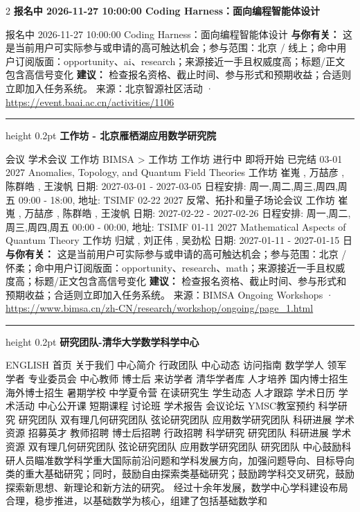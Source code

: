 \documentclass[10.5pt]{ctexart}
\begin{document}
\begin{multicols}{2}
{\large\bfseries 报名中 2026-11-27 10:00:00 Coding Harness：面向编程智能体设计}\par
报名中 2026-11-27 10:00:00 Coding Harness：面向编程智能体设计
\textbf{与你有关：} 这是当前用户可实际参与或申请的高可触达机会；参与范围：北京 / 线上；命中用户订阅版面：opportunity、ai、research；来源接近一手且权威度高；标题/正文包含高信号变化
\textbf{建议：} 检查报名资格、截止时间、参与形式和预期收益；合适则立即加入任务系统。
{\footnotesize\color{ormuted} 来源：北京智源社区活动 · \url{https://event.baai.ac.cn/activities/1106}}
\vspace{2mm}
\hrule height 0.2pt
\vspace{2mm}
{\large\bfseries 工作坊 - 北京雁栖湖应用数学研究院}\par
会议 学术会议 工作坊 BIMSA > 工作坊 工作坊 进行中 即将开始 已完结 03-01 2027 Anomalies, Topology, and Quantum Field Theories 工作坊 崔嵬 , 万喆彦 , 陈群皓 , 王浚帆 日期: 2027-03-01 - 2027-03-05 日程安排: 周一,周二,周三,周四,周五 09:00 - 18:00, 地址: TSIMF 02-22 2027 反常、拓扑和量子场论会议 工作坊 崔嵬 , 万喆彦 , 陈群皓 , 王浚帆 日期: 2027-02-22 - 2027-02-26 日程安排: 周一,周二,周三,周四,周五 00:00 - 00:00, 地址: TSIMF 01-11 2027 Mathematical Aspects of Quantum Theory 工作坊 归斌 , 刘正伟 , 吴劲松 日期: 2027-01-11 - 2027-01-15 日
\textbf{与你有关：} 这是当前用户可实际参与或申请的高可触达机会；参与范围：北京 / 怀柔；命中用户订阅版面：opportunity、research、math；来源接近一手且权威度高；标题/正文包含高信号变化
\textbf{建议：} 检查报名资格、截止时间、参与形式和预期收益；合适则立即加入任务系统。
{\footnotesize\color{ormuted} 来源：BIMSA Ongoing Workshops · \url{https://www.bimsa.cn/zh-CN/research/workshop/ongoing/page_1.html}}
\vspace{2mm}
\hrule height 0.2pt
\vspace{2mm}
{\large\bfseries 研究团队-清华大学数学科学中心}\par
ENGLISH 首页 关于我们 中心简介 行政团队 中心动态 访问指南 数学学人 领军学者 专业委员会 中心教师 博士后 来访学者 清华学者库 人才培养 国内博士招生 海外博士招生 暑期学校 中学夏令营 在读研究生 学生动态 人才跟踪 学术日历 学术活动 中心公开课 短期课程 讨论班 学术报告 会议论坛 YMSC教室预约 科学研究 研究团队 双有理几何研究团队 弦论研究团队 应用数学研究团队 科研进展 学术资源 招募英才 教师招聘 博士后招聘 行政招聘 科学研究 研究团队 科研进展 学术资源 双有理几何研究团队 弦论研究团队 应用数学研究团队 研究团队 中心鼓励科研人员瞄准数学科学重大国际前沿问题和学科发展方向，加强问题导向、目标导向类的重大基础研究；同时，鼓励自由探索类基础研究；鼓励跨学科交叉研究，鼓励探索新思想、新理论和新方法的研究。 经过十余年发展，数学中心学科建设布局合理，稳步推进，以基础数学为核心，组建了包括基础数学和

\end{multicols}
\end{document}
